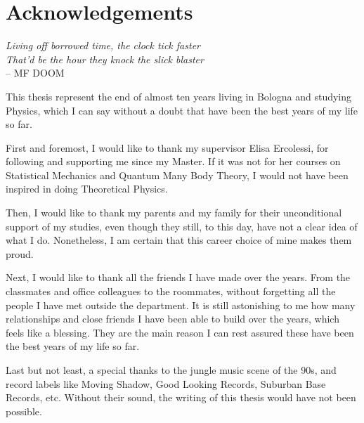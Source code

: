 \chapter*{Acknowledgements}


\begin{flushright}
    \emph{Living off borrowed time, the clock tick faster \\
    That'd be the hour they knock the slick blaster} \\
    \textsf{-- MF DOOM}
\end{flushright}

\vspace*{1cm}

This thesis represent the end of almost ten years living in Bologna and studying Physics, which I can say without a doubt that have been the best years of my life so far.

\medskip

First and foremost, I would like to thank my supervisor Elisa Ercolessi, for following and supporting me since my Master.
If it was not for her courses on Statistical Mechanics and Quantum Many Body Theory, I would not have been inspired in doing Theoretical Physics.

\smallskip

Then, I would like to thank my parents and my family for their unconditional support of my studies, even though they still, to this day, have not a clear idea of what I do.
Nonetheless, I am certain that this career choice of mine makes them proud.

\smallskip

Next, I would like to thank all the friends I have made over the years.
From the classmates and office colleagues to the roommates, without forgetting all the people I have met outside the department.
It is still astonishing to me how many relationships and close friends I have been able to build over the years, which feels like a blessing.
They are the main reason I can rest assured these have been the best years of my life so far.

\smallskip

Last but not least, a special thanks to the jungle music scene of the 90s, and record labels like Moving Shadow, Good Looking Records, Suburban Base Records, etc.
Without their sound, the writing of this thesis would have not been possible.
